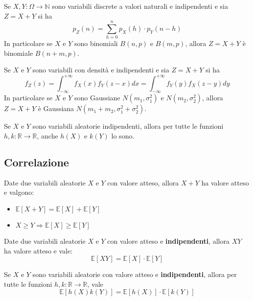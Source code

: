 \begin{proposition}
	Se $X,Y:\Omega \to \mathbb{N}$ sono variabili discrete a valori naturali e indipendenti e sia $Z=X+Y$ si ha
	\begin{equation}
		p_Z(n) = \sum_{h=0}^{n}p_X(h) \cdot p_Y(n-h)
	\end{equation}
	In particolare se $X$ e $Y$ sono binomiali $B(n,p)$ e $B(m,p)$, allora $Z=X+Y$ è binomiale $B(n+m,p)$.
\end{proposition}
\begin{proposition}
	Se $X$ e $Y$ sono variabili con densità e indipendenti e sia $Z=X+Y$ si ha
	\begin{equation}
		f_Z(z)=\int_{-\infty}^{+\infty}f_X(x)f_Y(z-x)dx = \int_{-\infty}^{+\infty}f_Y(y)f_X(z-y)dy
	\end{equation}
	In particolare se $X$ e $Y$ sono Gaussiane $N(m_1,\sigma_1^2)$ e $N(m_2,\sigma_2^2)$, allora $Z=X+Y$ è Gaussiana $N(m_1+m_2, \sigma_1^2+\sigma_2^2)$.
\end{proposition}

\begin{proposition}
	Se $X$ e $Y$ sono variabili aleatorie indipendenti, allora per tutte le funzioni $h,k: \mathbb{R} \to \mathbb{R}$, anche $h(X)$ e $k(Y)$ lo sono.
\end{proposition}

\subsection{Correlazione}
\begin{proposition}
	Date due variabili aleatorie $X$ e $Y$ con valore atteso, allora $X+Y$ ha valore atteso e valgono:
	\begin{itemize}
		\item $\mathbb{E}[X+Y] = \mathbb{E}[X] + \mathbb{E}[Y]$
		\item $X \geq Y \Longrightarrow \mathbb{E}[X] \geq \mathbb{E}[Y]$
	\end{itemize}
\end{proposition}
\begin{proposition}
	Date due variabili aleatorie $X$ e $Y$ con valore atteso e \textbf{indipendenti}, allora $XY$ ha valore atteso e vale:
	\begin{equation}
		\mathbb{E}[XY] = \mathbb{E}[X] \cdot \mathbb{E}[Y]
	\end{equation}
\end{proposition}

\begin{proposition}
	Se $X$ e $Y$ sono variabili aleatorie con valore atteso e \textbf{indipendenti}, allora per tutte le funzioni $h,k: \mathbb{R} \to \mathbb{R}$, vale
	\begin{equation}
		\mathbb{E}[h(X)k(Y)]=\mathbb{E}[h(X)]\cdot\mathbb{E}[k(Y)]
	\end{equation}
\end{proposition}


